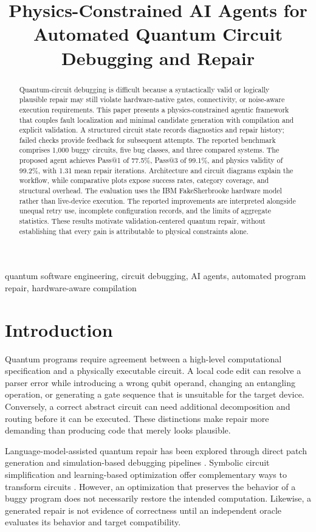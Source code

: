 \documentclass[conference]{IEEEtran}
\title{Physics-Constrained AI Agents for Automated Quantum Circuit Debugging and Repair}
\author{\IEEEauthorblockN{Alok Pandey}\IEEEauthorblockA{Indian Institute of Technology Patna}}
\begin{document}
\maketitle

\begin{abstract}
Quantum-circuit debugging is difficult because a syntactically valid or logically plausible repair may still violate hardware-native gates, connectivity, or noise-aware execution requirements. This paper presents a physics-constrained agentic framework that couples fault localization and minimal candidate generation with compilation and explicit validation. A structured circuit state records diagnostics and repair history; failed checks provide feedback for subsequent attempts. The reported benchmark comprises 1,000 buggy circuits, five bug classes, and three compared systems. The proposed agent achieves Pass@1 of 77.5\%, Pass@3 of 99.1\%, and physics validity of 99.2\%, with 1.31 mean repair iterations. Architecture and circuit diagrams explain the workflow, while comparative plots expose success rates, category coverage, and structural overhead. The evaluation uses the IBM FakeSherbrooke hardware model rather than live-device execution. The reported improvements are interpreted alongside unequal retry use, incomplete configuration records, and the limits of aggregate statistics. These results motivate validation-centered quantum repair, without establishing that every gain is attributable to physical constraints alone.
\end{abstract}
\begin{IEEEkeywords}
quantum software engineering, circuit debugging, AI agents, automated program repair, hardware-aware compilation
\end{IEEEkeywords}

\section{Introduction}
Quantum programs require agreement between a high-level computational specification and a physically executable circuit. A local code edit can resolve a parser error while introducing a wrong qubit operand, changing an entangling operation, or generating a gate sequence that is unsuitable for the target device. Conversely, a correct abstract circuit can need additional decomposition and routing before it can be executed. These distinctions make repair more demanding than producing code that merely looks plausible.

Language-model-assisted quantum repair has been explored through direct patch generation and simulation-based debugging pipelines \cite{guo2024repairing,pham2026qbuglm}. Symbolic circuit simplification and learning-based optimization offer complementary ways to transform circuits \cite{duncan2020graph,quarl2024}. However, an optimization that preserves the behavior of a buggy program does not necessarily restore the intended computation. Likewise, a generated repair is not evidence of correctness until an independent oracle evaluates its behavior and target compatibility.
\end{document}
